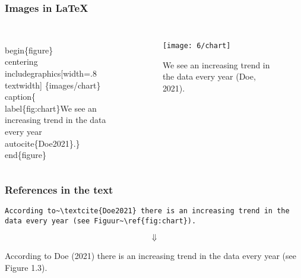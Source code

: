 \documentclass[aspectratio=169]{beamer}
\begin{document}
\begin{frame}
  \frametitle{Images in {\LaTeX}}

  \begin{columns}[c]

\begin{semiverbatim}
\small
\alert<1>{\\begin\{figure\}}
  \alert<2>{\\centering}
  \alert<3>{\\includegraphics[width=.8\\textwidth]
    \{images/chart\}}
 \alert<4>{\\caption\{\alert<5>{\\label\{fig:chart\}}We see an increasing trend in
     the data every year \alert<6>{\\autocite\{Doe2021\}}.\}}
\alert<1>{\\end\{figure\}}
\end{semiverbatim}

    \begin{figure}
      \centering
      \texttt{[image: 6/chart]}
      \caption{\label{fig:chart} We see an increasing trend in the data every year (Doe, 2021).}
    \end{figure}

  \end{columns}

\end{frame}

\begin{frame}[fragile]
  \frametitle{References in the text}

  \begin{verbatim}
According to~\textcite{Doe2021} there is an increasing trend in the data every year (see Figuur~\ref{fig:chart}).
\end{verbatim}

  \[\Downarrow\]

  \bigskip

  According to Doe (2021) there is an increasing trend in the data every year (see Figure 1.3).

\end{frame}
\end{document}
